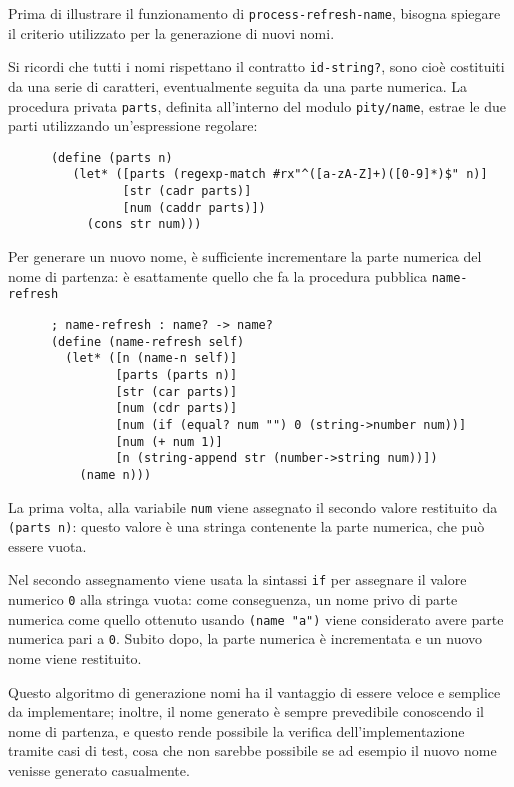 Prima di illustrare il funzionamento di \lstinline{process-refresh-name},
bisogna spiegare il criterio utilizzato per la generazione di nuovi nomi.

Si ricordi che tutti i nomi rispettano il contratto \lstinline{id-string?},
sono cio\`e costituiti da una serie di caratteri, eventualmente seguita
da una parte numerica. La procedura privata \lstinline{parts}, definita
all'interno del modulo \lstinline{pity/name}, estrae le due parti
utilizzando un'espressione regolare:

\begin{lstlisting}
      (define (parts n)
         (let* ([parts (regexp-match #rx"^([a-zA-Z]+)([0-9]*)$" n)]
                [str (cadr parts)]
                [num (caddr parts)])
           (cons str num)))
\end{lstlisting}

Per generare un nuovo nome, \`e sufficiente incrementare la parte numerica
del nome di partenza: \`e esattamente quello che fa la procedura pubblica
\lstinline{name-refresh}

\begin{lstlisting}
      ; name-refresh : name? -> name?
      (define (name-refresh self)
        (let* ([n (name-n self)]
               [parts (parts n)]
               [str (car parts)]
               [num (cdr parts)]
               [num (if (equal? num "") 0 (string->number num))]
               [num (+ num 1)]
               [n (string-append str (number->string num))])
          (name n)))
\end{lstlisting}

La prima volta, alla variabile \lstinline{num} viene assegnato il secondo
valore restituito da \lstinline{(parts n)}: questo valore \`e una stringa
contenente la parte numerica, che pu\`o essere vuota.

Nel secondo assegnamento viene usata la sintassi \lstinline{if} per
assegnare il valore numerico \lstinline{0} alla stringa vuota: come
conseguenza, un nome privo di parte numerica come quello ottenuto usando
\lstinline{(name "a")} viene considerato avere parte numerica pari a
\lstinline{0}. Subito dopo, la parte numerica \`e incrementata e un nuovo
nome viene restituito.

Questo algoritmo di generazione nomi ha il vantaggio di essere veloce e
semplice da implementare; inoltre, il nome generato \`e sempre prevedibile
conoscendo il nome di partenza, e questo rende possibile la verifica
dell'implementazione tramite casi di test, cosa che non sarebbe possibile
se ad esempio il nuovo nome venisse generato casualmente.


